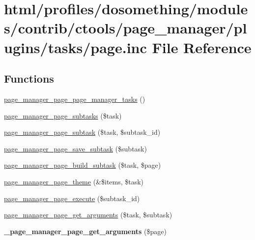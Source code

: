 \hypertarget{page_8inc}{
\section{html/profiles/dosomething/modules/contrib/ctools/page\_\-manager/plugins/tasks/page.inc File Reference}
\label{page_8inc}
}
\subsection*{Functions}
\begin{DoxyCompactItemize}
\item 
\hyperlink{page_8inc_aff2e5105c19b3717e3cecc658251c474}{page\_\-manager\_\-page\_\-page\_\-manager\_\-tasks} ()
\item 
\hyperlink{page_8inc_a2cfdc726207781912bf8e66d1f2d79e6}{page\_\-manager\_\-page\_\-subtasks} (\$task)
\item 
\hyperlink{page_8inc_a428528644ba98663d068f76e2112da20}{page\_\-manager\_\-page\_\-subtask} (\$task, \$subtask\_\-id)
\item 
\hyperlink{page_8inc_a86005bf57efc31c24e501a4ac8a1b9d6}{page\_\-manager\_\-page\_\-save\_\-subtask} (\$subtask)
\item 
\hyperlink{page_8inc_a144d13fecf042467cf2a89bf48784ec3}{page\_\-manager\_\-page\_\-build\_\-subtask} (\$task, \$page)
\item 
\hyperlink{page_8inc_a2d83630a85dcb6a388396698a92b65d6}{page\_\-manager\_\-page\_\-theme} (\&\$items, \$task)
\item 
\hyperlink{page_8inc_a4ee4a482e620d7558cf18fc65b05e6f3}{page\_\-manager\_\-page\_\-execute} (\$subtask\_\-id)
\item 
\hyperlink{page_8inc_a9a0f9d22ea4e51ed54e624efdd75f5c7}{page\_\-manager\_\-page\_\-get\_\-arguments} (\$task, \$subtask)
\item 
\hypertarget{page_8inc_a1ee069ac6fbcd251a888d4244a227ec4}{
{\bfseries \_\-page\_\-manager\_\-page\_\-get\_\-arguments} (\$page)}
\label{page_8inc_a1ee069ac6fbcd251a888d4244a227ec4}


\end{DoxyCompactItemize}
